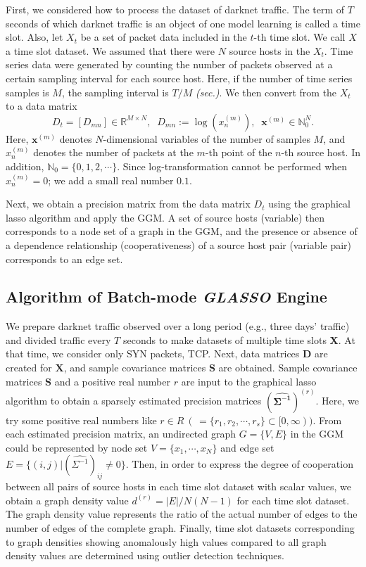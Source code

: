 \documentclass[conference]{IEEEtran}
\begin{document}
First, we considered how to process the dataset of darknet traffic.
The term of $T$ seconds of which darknet traffic is an object of one model learning is called a time slot.
Also, let $X_t$ be a set of packet data included in the $t$-th time slot.
We call $X$ a time slot dataset.
We assumed that there were $N$ source hosts in the $X_t$.
Time series data were generated by counting the number of packets observed at a certain sampling interval for each source host.
Here, if the number of time series samples is $M$, the sampling interval is $T/M$ \textit{(sec.)}.
We then convert from the $X_t$ to a data matrix
\begin{equation*}
D_t=[D_{mn}]\in\mathbb{R}^{M \times N},
\;\;D_{mn} := \log(x_n^{(m)}),
\;\;\bm{x}^{(m)}\in\mathbb{N}_0^{N}.
\end{equation*}
Here, $\bm{x}^{(m)}$ denotes $N$-dimensional variables of the number of samples $M$, and $x_n^{(m)}$ denotes the number of packets at the $m$-th point of the $n$-th source host.
In addition, $\mathbb{N}_0=\{0,1,2,\cdots\}$.
Since log-transformation cannot be performed when $x_n^{(m)}=0$; we add a small real number $0.1$.

Next, we obtain a precision matrix from the data matrix $D_t$ using the graphical lasso algorithm and apply the GGM.
A set of source hosts (variable) then corresponds to a node set of a graph in the GGM, and the presence or absence of a dependence relationship (cooperativeness) of a source host pair (variable pair) corresponds to an edge set.




\subsection{Algorithm of Batch-mode \textit{GLASSO} Engine}
\label{Batch}
We prepare darknet traffic observed over a long period (e.g., three days' traffic) and divided traffic every $T$ seconds to make datasets of multiple time slots $\bm{X}$.
At that time, we consider only SYN packets, TCP.
Next, data matrices $\bm{D}$ are created for $\bm{X}$, and sample covariance matrices $\bm{S}$ are obtained.
Sample covariance matrices $\bm{S}$ and a positive real number $r$ are input to the graphical lasso algorithm to obtain a sparsely estimated precision matrices ${(\bm{\hat{\Sigma^{-1}}})}^{(r)}$.
Here, we try some positive real numbers like $r \in R \  ( \, = \{r_1, r_2, \cdots, r_s\} \subset [0,\infty))$.
From each estimated precision matrix, an undirected graph $G = \{V, E\}$ in the GGM could be represented by node set $V=\{x_{1}, \cdots, x_{N}\}$ and edge set $E=\{(i,j)|{(\hat{\Sigma^{-1}})}_{ij}\neq0\}$.
Then, in order to express the degree of cooperation between all pairs of source hosts in each time slot dataset with scalar values, we obtain a graph density value $d^{(r)}=|E|/N(N-1)$ for each time slot dataset.
The graph density value represents the ratio of the actual number of edges to the number of edges of the complete graph.
Finally, time slot datasets corresponding to graph densities showing anomalously high values compared to all graph density values are determined using outlier detection techniques.
\end{document}
